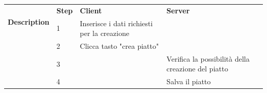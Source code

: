 \begin{table}[H]
\begin{tabularx}{\linewidth}{|l|X|X|X|}
    \hline \multirow{2}{*}{\textbf{Description}} & \textbf{Step}                                                                                                                           &
    \textbf{Client}                              & \textbf{Server}                                                                                                                                                                                                                            \\
    \cline{2-4}                                  & 1                                                                                                                                       & Inserisce i dati richiesti per la creazione &                                                    \\
    \cline{2-4}                                  & 2                                                                                                                                       & Clicca tasto "crea piatto"                  &                                                    \\
    \cline{2-4}                                  & 3                                                                                                                                       &                                             & Verifica la possibilità della creazione del piatto \\
    \cline{2-4}                                  & 4                                                                                                                                       &                                             & Salva il piatto                                    \\
    \hline
  \end{tabularx}
\end{table}
